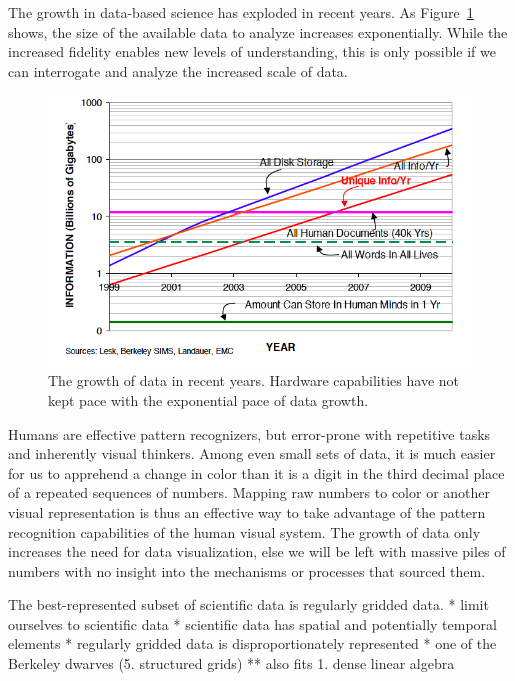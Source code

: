 
The growth in data-based science has exploded in recent years.  As
Figure~\ref{fig:growth} shows, the size of the available data to
analyze increases exponentially.  While the increased fidelity
enables new levels of understanding, this is only possible if we can
interrogate and analyze the increased scale of data.

\begin{figure}
	\includegraphics[width=\linewidth]{images/growth}

  \caption{The growth of data in recent years.  Hardware capabilities
  have not kept pace with the exponential pace of data growth.}

	\label{fig:growth}
\end{figure}

Humans are effective pattern recognizers, but error-prone with
repetitive tasks and inherently visual thinkers.  Among even small sets
of data, it is much easier for us to apprehend a change in color than
it is a digit in the third decimal place of a repeated sequences of
numbers.  Mapping raw numbers to color or another visual representation
is thus an effective way to take advantage of the pattern recognition
capabilities of the human visual system.  The growth of data only
increases the need for data visualization, else we will be left with
massive piles of numbers with no insight into the mechanisms or
processes that sourced them.

The best-represented subset of scientific data is regularly gridded
data.
	* limit ourselves to scientific data
	* scientific data has spatial and potentially temporal elements
	* regularly gridded data is disproportionately represented
	* one of the Berkeley dwarves (5. structured grids)
	** also fits 1. dense linear algebra

